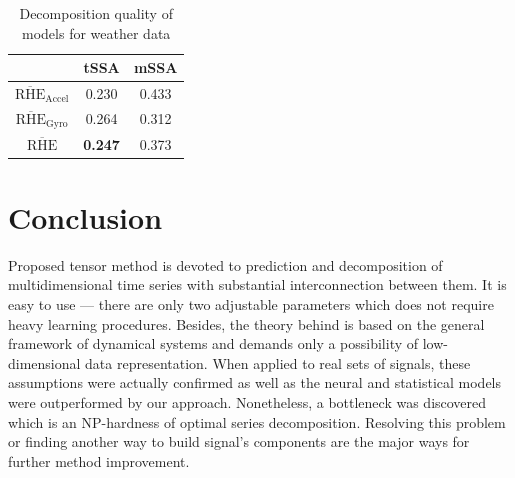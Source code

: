 \documentclass[referee, pdflatex]{sn-jnl}
\theoremstyle{definition}
\theoremstyle{plain}
\begin{document}
	\def\arraystretch{1.2}
	\begin{table}[h!]
		\centering
		\caption{Decomposition quality of models for weather data}\label{tab:decomp_weather_results}
		\begin{tabular}{|c|c|c|}
			\hline
			& tSSA  & mSSA           \\ \hline
			$ \overline{\text{RHE}}_{\text{Accel}} $   & 0.230 & 0.433          \\ \hline
			$ \overline{\text{RHE}}_{\text{Gyro}} $ & 0.264 & 0.312          \\ \hline
			$ \overline{\text{RHE}} $         & \textbf{0.247} & 0.373 \\ \hline
		\end{tabular}
	\end{table}	
	
	\section{Conclusion}
	
		Proposed tensor method is devoted to prediction and decomposition of multidimensional time series with substantial interconnection between them. It is easy to use --- there are only two adjustable parameters which does not require heavy learning procedures. Besides, the theory behind is based on the general framework of dynamical systems and demands only a possibility of low-dimensional data representation. When applied to real sets of signals, these assumptions were actually confirmed as well as the neural and statistical models were outperformed by our approach. Nonetheless, a bottleneck was discovered which is an NP-hardness of optimal series decomposition. Resolving this problem or finding another way to build signal's components are the major ways for further method improvement.
		
		\printbibliography
	
 
\end{document}
